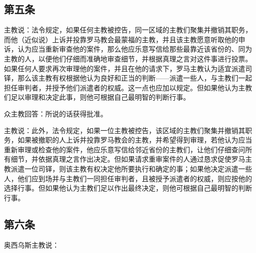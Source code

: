 
\subsection{第五条}

主教说：法令规定，如果任何主教被控告，同一区域的主教们聚集并撤销其职务，而他（近似说）上诉并投靠罗马教会最蒙福的主教，并且该主教愿意听取他的申诉，认为应当重新审查他的案件，那么他应乐意写信给那些最靠近该省份的、同为主教的人，以便他们仔细而准确地审查细节，并根据真理之言对这件事进行投票。如果任何人要求再次审理他的案件，并且在他的请求下，罗马主教认为适宜派遣司铎，那么该主教有权根据他认为良好和正当的判断——派遣一些人，与主教们一起担任审判者，并授予他们派遣者的权威。这一点也应加以规定。但如果他认为主教们足以审理和决定此事，则他可根据自己最明智的判断行事。\par

众主教回答：所说的话获得批准。\par

主教说：此外，法令规定，如果一位主教被控告，该区域的主教们聚集并撤销其职务，如果被撤职的人上诉并投靠罗马教会的主教，并希望得到审理，若他认为应当重新审理或检查他的案件，他应乐意写信给邻近省份的主教们，让他们仔细查问所有细节，并依据真理之言作出决定。但如果请求重审案件的人通过恳求促使罗马主教派遣一位司铎，则该主教有权决定他所要执行和确定的事；如果他决定派遣一些人，他们应到场并与主教们一同担任审判者，且被授予派遣者的权威，则应按他的选择行事。但如果他认为主教们足以作出最终决定，则他可根据自己最明智的判断行事。\par


\subsection{第六条}

奥西乌斯主教说：\par

